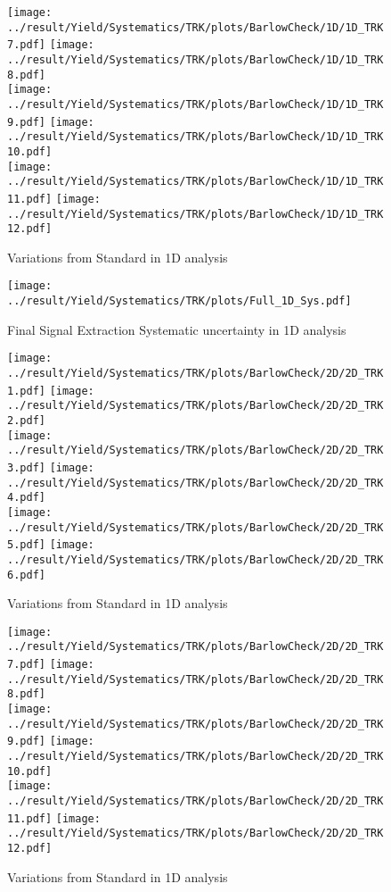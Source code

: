 \begin{figure}
	\centering
		\texttt{[image: ../result/Yield/Systematics/TRK/plots/BarlowCheck/1D/1D\_TRK7.pdf]}
		\texttt{[image: ../result/Yield/Systematics/TRK/plots/BarlowCheck/1D/1D\_TRK8.pdf]}\\
		\texttt{[image: ../result/Yield/Systematics/TRK/plots/BarlowCheck/1D/1D\_TRK9.pdf]}
		\texttt{[image: ../result/Yield/Systematics/TRK/plots/BarlowCheck/1D/1D\_TRK10.pdf]}\\
		\texttt{[image: ../result/Yield/Systematics/TRK/plots/BarlowCheck/1D/1D\_TRK11.pdf]}
		\texttt{[image: ../result/Yield/Systematics/TRK/plots/BarlowCheck/1D/1D\_TRK12.pdf]}\\
		\caption{Variations from Standard in 1D analysis}
		\label{}
\end{figure}

\begin{figure}
	\centering
		\texttt{[image: ../result/Yield/Systematics/TRK/plots/Full\_1D\_Sys.pdf]}
		\caption{Final Signal Extraction Systematic uncertainty in 1D analysis}
		\label{}
\end{figure}

\newpage
\begin{figure}
	\centering
		\texttt{[image: ../result/Yield/Systematics/TRK/plots/BarlowCheck/2D/2D\_TRK1.pdf]}
		\texttt{[image: ../result/Yield/Systematics/TRK/plots/BarlowCheck/2D/2D\_TRK2.pdf]}\\
		\texttt{[image: ../result/Yield/Systematics/TRK/plots/BarlowCheck/2D/2D\_TRK3.pdf]}
		\texttt{[image: ../result/Yield/Systematics/TRK/plots/BarlowCheck/2D/2D\_TRK4.pdf]}\\
		\texttt{[image: ../result/Yield/Systematics/TRK/plots/BarlowCheck/2D/2D\_TRK5.pdf]}
		\texttt{[image: ../result/Yield/Systematics/TRK/plots/BarlowCheck/2D/2D\_TRK6.pdf]}\\
		\caption{Variations from Standard in 1D analysis}
		\label{}
\end{figure}

\begin{figure}
	\centering
		\texttt{[image: ../result/Yield/Systematics/TRK/plots/BarlowCheck/2D/2D\_TRK7.pdf]}
		\texttt{[image: ../result/Yield/Systematics/TRK/plots/BarlowCheck/2D/2D\_TRK8.pdf]}\\
		\texttt{[image: ../result/Yield/Systematics/TRK/plots/BarlowCheck/2D/2D\_TRK9.pdf]}
		\texttt{[image: ../result/Yield/Systematics/TRK/plots/BarlowCheck/2D/2D\_TRK10.pdf]}\\
		\texttt{[image: ../result/Yield/Systematics/TRK/plots/BarlowCheck/2D/2D\_TRK11.pdf]}
		\texttt{[image: ../result/Yield/Systematics/TRK/plots/BarlowCheck/2D/2D\_TRK12.pdf]}\\
		\caption{Variations from Standard in 1D analysis}
		\label{}
\end{figure}

